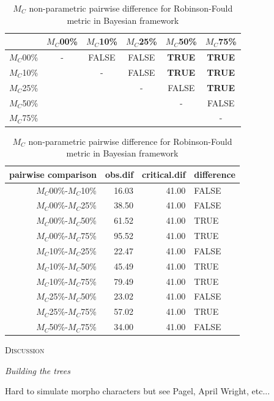 \documentclass[12pt,letterpaper]{article}
\renewcommand{\section}[1]{%
\bigskip
\begin{center}
\begin{Large}
\normalfont\scshape #1
\medskip
\end{Large}
\end{center}}
\renewcommand{\subsection}[1]{%
\bigskip
\begin{center}
\begin{large}
\normalfont\itshape #1
\end{large}
\end{center}}
\begin{document}
\begin{table}
\caption{$M_C$ non-parametric pairwise difference for Robinson-Fould metric in Bayesian framework}
\centering
\begin{tabular}{c|ccccc}
    \hline
              & $M_C$00\% & $M_C$10\% & $M_C$25\% & $M_C$50\% & $M_C$75\% \\
    \hline
    $M_C$00\% & - & FALSE & FALSE & \textbf{TRUE} & \textbf{TRUE}\\
    $M_C$10\% & & - & FALSE & \textbf{TRUE} & \textbf{TRUE} \\
    $M_C$25\% & & & - & FALSE & \textbf{TRUE} \\
    $M_C$50\% & & & & - & FALSE \\
    $M_C$75\% & & & & & - \\
    \hline
\end{tabular}
\centering
\begin{tabular}{rrrl}
 pairwise comparison & obs.dif & critical.dif & difference \\ 
  \hline
  $M_C$00\%-$M_C$10\% & 16.03 & 41.00 & FALSE \\ 
  $M_C$00\%-$M_C$25\% & 38.50 & 41.00 & FALSE \\ 
  $M_C$00\%-$M_C$50\% & 61.52 & 41.00 & TRUE \\ 
  $M_C$00\%-$M_C$75\% & 95.52 & 41.00 & TRUE \\ 
  $M_C$10\%-$M_C$25\% & 22.47 & 41.00 & FALSE \\ 
  $M_C$10\%-$M_C$50\% & 45.49 & 41.00 & TRUE \\ 
  $M_C$10\%-$M_C$75\% & 79.49 & 41.00 & TRUE \\ 
  $M_C$25\%-$M_C$50\% & 23.02 & 41.00 & FALSE \\ 
  $M_C$25\%-$M_C$75\% & 57.02 & 41.00 & TRUE \\ 
  $M_C$50\%-$M_C$75\% & 34.00 & 41.00 & FALSE \\ 
   \hline
\end{tabular}
\label{MC_results}
\end{table}

%
%


\section{Discussion}

\subsection{Building the trees}
Hard to simulate morpho characters but see Pagel, April Wright, etc...
\end{document}
